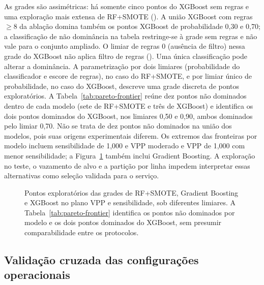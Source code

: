 As grades são assimétricas: há somente cinco pontos do XGBoost sem regras e uma exploração mais extensa de RF+SMOTE (). A união XGBoost com regras $\geq8$ da ablação domina também os pontos XGBoost de probabilidade 0,30 e 0,70; a classificação de não dominância na tabela restringe-se à grade sem regras e não vale para o conjunto ampliado. O limiar de regras 0 (ausência de filtro) nessa grade do XGBoost não aplica filtro de regras (). Uma única classificação pode alterar a dominância. A parametrização por dois limiares (probabilidade do classificador e escore de regras), no caso do RF+SMOTE, e por limiar único de probabilidade, no caso do XGBoost, descreve uma grade discreta de pontos exploratórios. A Tabela~\ref{tab:pareto-frontier} reúne dez pontos não dominados dentro de cada modelo (sete de RF+SMOTE e três de XGBoost) e identifica os dois pontos dominados do XGBoost, nos limiares 0,50 e 0,90, ambos dominados pelo limiar 0,70. Não se trata de dez pontos não dominados na união dos modelos, pois suas origens experimentais diferem. Os extremos das fronteiras por modelo incluem sensibilidade de 1,000 e VPP moderado e VPP de 1,000 com menor sensibilidade; a Figura~\ref{fig:pareto-frontier} também inclui Gradient Boosting. A exploração no teste, o vazamento de alvo e a partição por linha impedem interpretar essas alternativas como seleção validada para o serviço.



\begin{figure}[!ht]
\centering

\caption{Pontos exploratórios das grades de RF+SMOTE, Gradient Boosting e XGBoost no plano VPP e sensibilidade, sob diferentes limiares. A Tabela~\ref{tab:pareto-frontier} identifica os pontos não dominados por modelo e os dois pontos dominados do XGBoost, sem presumir comparabilidade entre os protocolos.}
\label{fig:pareto-frontier}
\end{figure}

\subsection{Validação cruzada das configurações operacionais}\label{sec:e3-validacao-cruzada}

